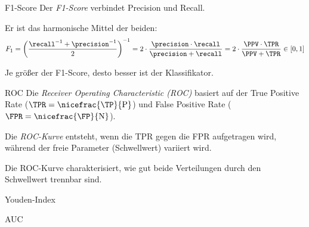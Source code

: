 \begin{defi}{F1-Score}
    Der \emph{F1-Score} verbindet Precision und Recall.

    Er ist das harmonische Mittel der beiden:
    \[
        F_1 = \left( \frac{\recall^{-1} + \precision^{-1}}{2} \right)^{-1} = 2 \cdot \frac{\precision \cdot \recall}{\precision + \recall} = 2 \cdot \frac{\PPV \cdot \TPR}{\PPV + \TPR} \in [ 0, 1 ]
    \]

    Je größer der F1-Score, desto besser ist der Klassifikator.
\end{defi}

\begin{defi}{ROC}
    Die \emph{Receiver Operating Characteristic (ROC)} basiert auf der True Positive Rate ($\TPR = \nicefrac{\TP}{\text{P}}$)  und False Positive Rate ($\FPR = \nicefrac{\FP}{\text{N}}$).

    Die \emph{ROC-Kurve} entsteht, wenn die TPR gegen die FPR aufgetragen wird, während der freie Parameter (Schwellwert) variiert wird.

    Die ROC-Kurve charakterisiert, wie gut beide Verteilungen durch den Schwellwert trennbar sind.


\end{defi}

\begin{defi}{Youden-Index}

\end{defi}

\begin{defi}{AUC}

\end{defi}